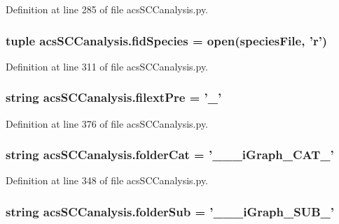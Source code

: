 Definition at line 285 of file acs\-S\-C\-Canalysis.\-py.

\hypertarget{a00102_aba2f982879776e057b35971b3653549e}{
\subsubsection[{fid\-Species}]{\setlength{\rightskip}{0pt plus 5cm}tuple acs\-S\-C\-Canalysis.\-fid\-Species = open({\bf species\-File}, '{\bf r}')}}\label{a00102_aba2f982879776e057b35971b3653549e}


Definition at line 311 of file acs\-S\-C\-Canalysis.\-py.

\hypertarget{a00102_a60ff937c050eef601bd84134d1913d8a}{
\subsubsection[{filext\-Pre}]{\setlength{\rightskip}{0pt plus 5cm}string acs\-S\-C\-Canalysis.\-filext\-Pre = '\-\_\-'}}\label{a00102_a60ff937c050eef601bd84134d1913d8a}


Definition at line 376 of file acs\-S\-C\-Canalysis.\-py.

\hypertarget{a00102_a1cbfd083273176eebfe0260e8384acef}{
\subsubsection[{folder\-Cat}]{\setlength{\rightskip}{0pt plus 5cm}string acs\-S\-C\-Canalysis.\-folder\-Cat = '\-\_\-\-\_\-\_\-i\-Graph\-\_\-\-C\-A\-T\-\_\-'}}\label{a00102_a1cbfd083273176eebfe0260e8384acef}


Definition at line 348 of file acs\-S\-C\-Canalysis.\-py.

\hypertarget{a00102_a90c2bcabbdb271c2c3347ebea4c259bc}{
\subsubsection[{folder\-Sub}]{\setlength{\rightskip}{0pt plus 5cm}string acs\-S\-C\-Canalysis.\-folder\-Sub = '\-\_\-\-\_\-\_\-i\-Graph\-\_\-\-S\-U\-B\-\_\-'}}\label{a00102_a90c2bcabbdb271c2c3347ebea4c259bc}


